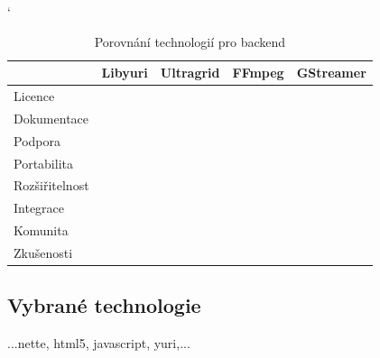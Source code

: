 \documentclass[thesis=M,czech]{FITthesis}[2012/06/26]
\begin{document}
\begin{table}[]
\catcode` %
\centering
\begin{tabular}{l|l|l|l|l|}
\cline{2-5}
\multicolumn{1}{c|}{}                & \multicolumn{1}{c|}{Libyuri} & \multicolumn{1}{c|}{Ultragrid} & \multicolumn{1}{c|}{FFmpeg} & \multicolumn{1}{c|}{GStreamer} \\ \hline
\multicolumn{1}{|l|}{Licence}        &                              &                                &                             &                                \\ \hline
\multicolumn{1}{|l|}{Dokumentace}    &                              &                                &                             &                                \\ \hline
\multicolumn{1}{|l|}{Podpora}        &                              &                                &                             &                                \\ \hline
\multicolumn{1}{|l|}{Portabilita}    &                              &                                &                             &                                \\ \hline
\multicolumn{1}{|l|}{Rozšiřitelnost} &                              &                                &                             &                                \\ \hline
\multicolumn{1}{|l|}{Integrace}      &                              &                                &                             &                                \\ \hline
\multicolumn{1}{|l|}{Komunita}       &                              &                                &                             &                                \\ \hline
\multicolumn{1}{|l|}{Zkušenosti}     &                              &                                &                             &                                \\ \hline
\end{tabular}
\caption{Porovnání technologií pro backend}
\label{table_backend}
\end{table}

\subsection{Vybrané technologie} \label{subsec:analyza_technologie_vybrane}
...nette, html5, javascript, yuri,... 
\end{document}
